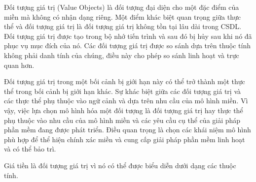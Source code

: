Đối tượng giá trị (Value Objects) là đối tượng đại diện cho một đặc điểm của miền mà không có nhận dạng riêng.       Một điểm khác biệt quan trọng giữa thực thể và đối tượng giá trị là đối tượng giá trị không tồn tại lâu dài trong CSDL.    Đối tượng giá trị được tạo trong bộ nhớ tiến trình và sau đó bị hủy sau khi nó đã phục vụ mục đích của nó.   Các đối tượng giá trị   được so sánh dựa trên thuộc tính       không phải danh tính của chúng, điều này cho phép so sánh linh hoạt và trực quan hơn.


Đối tượng giá trị trong một bối cảnh bị giới hạn này    có thể trở thành một thực thể trong bối cảnh bị giới hạn khác. Sự khác biệt giữa các đối tượng giá trị và các thực thể phụ thuộc vào ngữ cảnh và dựa trên nhu cầu của mô hình miền.  Vì vậy,  việc lựa chọn mô hình hóa một đối tượng là đối tượng giá trị hay thực thể phụ thuộc vào nhu cầu của mô hình miền và các yêu cầu cụ thể của giải pháp phần mềm đang được phát triển. Điều quan trọng là chọn các khái niệm mô hình phù hợp để thể hiện chính xác miền và cung cấp giải pháp phần mềm linh hoạt và có thể bảo trì.



\begin{example}      Giá tiền là     đối tượng giá trị         vì nó có thể được biểu diễn dưới dạng   các thuộc tính.    \end{example}













